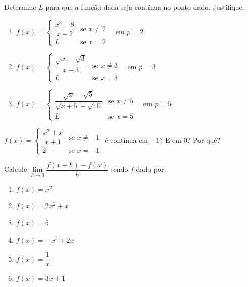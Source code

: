 \begin{exercicio}[2]
Determine $L$ para que a função dada seja contínua no ponto dado. Justifique.
\begin{enumerate}[label=\alph*)]
    \item $f(x) = \begin{cases} \dfrac{x^3 - 8}{x - 2} & \text{se } x \neq 2 \\ L & \text{se } x = 2 \end{cases} \quad \text{em } p = 2$
    \item $f(x) = \begin{cases} \dfrac{\sqrt{x} - \sqrt{3}}{x - 3} & \text{se } x \neq 3 \\ L & \text{se } x = 3 \end{cases} \quad \text{em } p = 3$
    \item $f(x) = \begin{cases} \dfrac{\sqrt{x} - \sqrt{5}}{\sqrt{x + 5} - \sqrt{10}} & \text{se } x \neq 5 \\ L & \text{se } x = 5 \end{cases} \quad \text{em } p = 5$
\end{enumerate}
\end{exercicio}

\begin{exercicio}[3]
$f(x) = \begin{cases} \dfrac{x^2 + x}{x + 1} & \text{se } x \neq -1 \\ 2 & \text{se } x = -1 \end{cases}$ é contínua em $-1$? E em $0$? Por quê?
\end{exercicio}

\begin{exercicio}[4]
Calcule $\lim\limits_{h \to 0} \dfrac{f(x + h) - f(x)}{h}$ sendo $f$ dada por:
\begin{enumerate}[label=\alph*)]
    \item $f(x) = x^2$
    \item $f(x) = 2x^2 + x$
    \item $f(x) = 5$
    \item $f(x) = -x^3 + 2x$
    \item $f(x) = \dfrac{1}{x}$
    \item $f(x) = 3x + 1$
\end{enumerate}
\end{exercicio}

